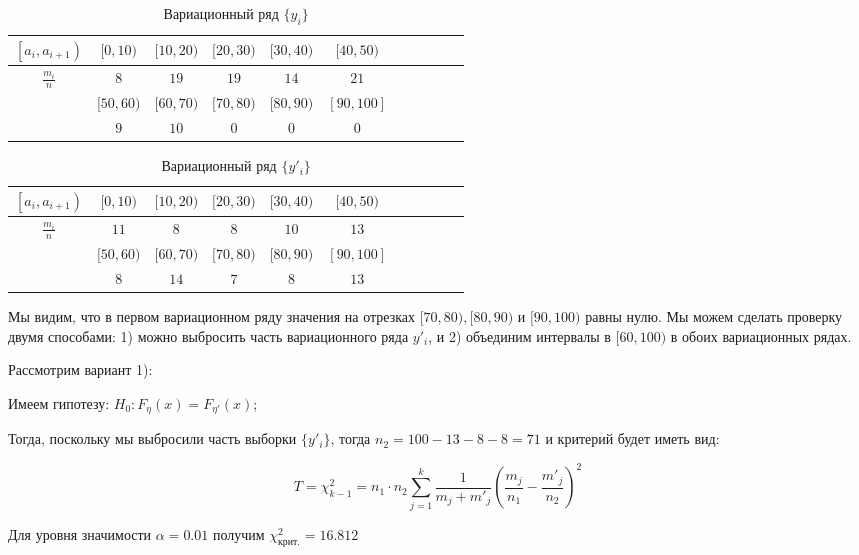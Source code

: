 \documentclass{report}
\begin{document}
\begin{table}[h]
\begin{tabularx}{\textwidth}{|c|c|c|c|c|c|c|c|c|c|c|}
\hline
    $\left [a_i, a_{i+1}\right)$ & $[0, 10)$ & $[10,20)$ & $[20,30)$ & $[30,40)$ & $[40,50)$ \\
\hline
    $\frac{m_i}{n}$ & $8$ & $19$ & $19$ & $14$ & $21$ \\
\hline
\hline
    & $[50,60)$ & $[60,70)$ & $[70,80)$ & $[80,90)$ & $[90,100]$ \\
\hline
    & $9$ & $10$ & $0$ & $0$ & $0$ \\
\hline
\end{tabularx}
\setcounter{table}{2}
\caption {Вариационный ряд $\{ y_i \}$}
\end{table}

\begin{table}[h]
\begin{tabularx}{\textwidth}{|c|c|c|c|c|c|c|c|c|c|c|}
\hline
    $\left [a_i, a_{i+1}\right)$ & $[0, 10)$ & $[10,20)$ & $[20,30)$ & $[30,40)$ & $[40,50)$ \\
\hline
    $\frac{m_i}{n}$ & $11$ & $8$ & $8$ & $10$ & $13$ \\
\hline
\hline
    & $[50,60)$ & $[60,70)$ & $[70,80)$ & $[80,90)$ & $[90,100]$ \\
\hline
    & $8$ & $14$ & $7$ & $8$ & $13$ \\
\hline
\end{tabularx}
\setcounter{table}{2}
\caption {Вариационный ряд $\{ y'_i \}$}
\end{table}

Мы видим, что в первом вариационном ряду значения на отрезках $[70, 80), [80, 90)$ и $[90, 100)$ равны нулю. Мы можем сделать проверку двумя способами: 1) можно выбросить часть вариационного ряда $y'_i$, и 2) объединим интервалы в $[60,100)$ в обоих вариационных рядах.

Рассмотрим вариант 1):

Имеем гипотезу: $H_0 : F_{\eta}(x) = F_{\eta'}(x)$;

Тогда, поскольку мы выбросили часть выборки $\{y'_i\}$, тогда $n_2 = 100 - 13 - 8 - 8 = 71$ и критерий будет иметь вид:

\begin{equation}
T = \chi^2_{k-1} = n_1 \cdot n_2 \sum \limits^{k}_{j=1} \frac{1}{m_j + m'_j} \left(\frac{m_j}{n_1} - \frac{m'_j}{n_2}\right)^2
\end{equation}

Для уровня значимости $\alpha = 0.01$ получим $\chi^2_\text{крит.} = 16.812$
\end{document}
